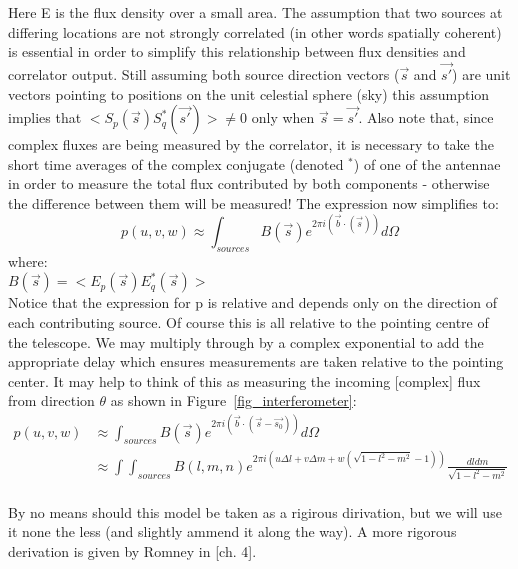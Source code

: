 \documentclass[a4paper,10pt]{report}
\begin{document}
Here E is the flux density over a small area. The assumption that two sources at differing locations are not strongly correlated (in other words spatially coherent) is
essential in order to simplify this relationship between flux densities and correlator output. Still assuming both source 
direction vectors ($\vec{s}$ and $\vec{s'}$) are unit vectors pointing to positions on the unit celestial sphere (sky) this
assumption implies that $<S_p(\vec{s})S_q^*(\vec{s'})> \neq 0$ only when $\vec{s} = \vec{s'}$. Also note that, since complex fluxes
are being measured by the correlator, it is necessary to take the short time averages of the complex conjugate (denoted $^{*}$)
of one of the antennae in order to measure the total flux contributed by both components - otherwise the difference between
them will be measured! The expression now simplifies to:
\begin{equation*}
 p(u,v,w) \approx \int_{sources}{B(\vec{s})e^{2\pi i(\vec{b}\cdot(\vec{s}))}d\Omega}
\end{equation*}
where:\\
$B(\vec{s}) = <E_p(\vec{s})E_q^*(\vec{s})>$\\

Notice that the expression for p is relative and depends only on the direction of each contributing source. Of course this
is all relative to the pointing centre of the telescope. We may multiply through by a complex exponential to add the appropriate 
delay which ensures measurements are taken relative to the pointing center. It may help to think of this as measuring the
incoming [complex] flux from direction $\theta$ as shown in Figure~\ref{fig_interferometer}:
\begin{equation}
 \label{EQN_ONE_CORR_RIME}
 \begin{split}
 p(u,v,w) &\approx \int_{sources}{B(\vec{s})e^{2\pi i(\vec{b}\cdot(\vec{s}-\vec{s_0}))}d\Omega}\\
	  &\approx \int\int_{sources}{B(l,m,n)e^{2\pi i(u\Delta l+v\Delta m+w(\sqrt{1-l^2-m^2}-1))}\frac{dldm}{\sqrt{1-l^2-m^2}}}\\
 \end{split}
\end{equation}

By no means should this model be taken as a rigirous dirivation, but we will use it none the less (and slightly ammend it 
along the way). A more rigorous derivation is given by Romney in \cite{taylor1999synthesis}[ch. 4].
\end{document}
